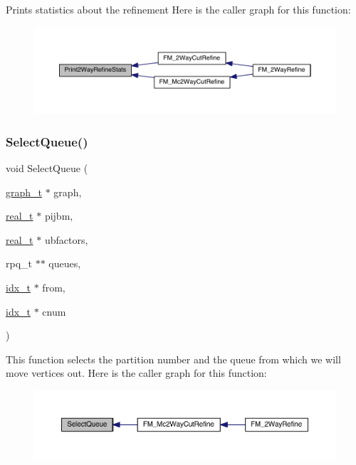 Prints statistics about the refinement Here is the caller graph for this function\+:\nopagebreak
\begin{figure}[H]
\begin{center}
\leavevmode
\includegraphics[width=350pt]{a00197_a6e4663b4acc63be2c1b33533e7827f1a_icgraph}
\end{center}
\end{figure}
\mbox{\label{a00197_a51193f4b76d298d94234642136879390}} 
\subsubsection{\texorpdfstring{Select\+Queue()}{SelectQueue()}}
{\footnotesize\ttfamily void Select\+Queue (\begin{DoxyParamCaption}\item[{\hyperlink{a00734}{graph\+\_\+t} $\ast$}]{graph,  }\item[{\hyperlink{a00876_a1924a4f6907cc3833213aba1f07fcbe9}{real\+\_\+t} $\ast$}]{pijbm,  }\item[{\hyperlink{a00876_a1924a4f6907cc3833213aba1f07fcbe9}{real\+\_\+t} $\ast$}]{ubfactors,  }\item[{rpq\+\_\+t $\ast$$\ast$}]{queues,  }\item[{\hyperlink{a00876_aaa5262be3e700770163401acb0150f52}{idx\+\_\+t} $\ast$}]{from,  }\item[{\hyperlink{a00876_aaa5262be3e700770163401acb0150f52}{idx\+\_\+t} $\ast$}]{cnum }\end{DoxyParamCaption})}

This function selects the partition number and the queue from which we will move vertices out. Here is the caller graph for this function\+:\nopagebreak
\begin{figure}[H]
\begin{center}
\leavevmode
\includegraphics[width=350pt]{a00197_a51193f4b76d298d94234642136879390_icgraph}
\end{center}
\end{figure}
